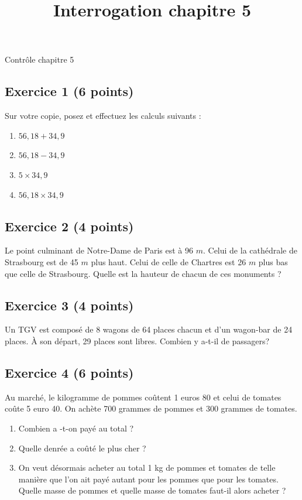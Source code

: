 \documentclass[14 pt]{extarticle}
\title{Interrogation chapitre 5}
\date{}
\theoremstyle{plain}
\begin{document}
\begin{center}{\Large Contrôle chapitre 5}\\ 
 \end{center}
 
 
  \subsection*{Exercice 1 (6 points)}
  
Sur votre copie, posez et effectuez les calculs suivants : \begin{enumerate}
\item $56,18 + 34, 9$
\item $56,18 - 34, 9$
\item $5 \times 34, 9$
\item $56,18 \times 34, 9$
\end{enumerate}  

\subsection*{Exercice 2 (4 points)}

Le point culminant de Notre-Dame de Paris est à 96 $m$. Celui de la cathédrale de Strasbourg est de 45 $m$ plus haut. Celui de celle de Chartres est 26 $m$ plus bas que celle de Strasbourg. Quelle est la hauteur de chacun de ces monuments ?

\subsection*{Exercice 3 (4 points)}
Un TGV est composé de 8 wagons de 64 places chacun et d'un wagon-bar de 24 places. À son départ, 29 places sont libres. Combien y a-t-il de passagers? 

\subsection*{Exercice 4 (6 points)}
 
 Au marché, le kilogramme de pommes coûtent 1 euros 80 et celui de tomates coûte 5 euro 40. On achète 700 grammes de pommes et 300 grammes de tomates. 
 \begin{enumerate}
 \item Combien a -t-on payé au total ? 
 \item Quelle denrée a coûté le plus cher ?
 \item On veut désormais acheter au total 1 kg de pommes et tomates de telle manière que l'on ait payé autant pour les pommes que pour les tomates. Quelle masse de pommes et quelle masse de tomates faut-il alors acheter ?
 \end{enumerate}
 	
\end{document}
